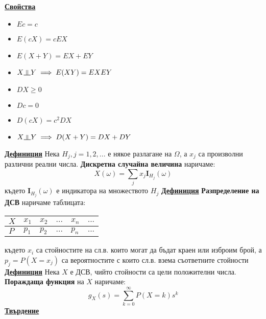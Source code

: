 \documentclass{article}
\newcommand{\indep}{\rotatebox[origin=c]{90}{$\models$}}
\begin{document}
\textbf{\underline{Свойства}}
\begin{multicols}{2}
    \begin{itemize}
        \item $Ec = c$
        \item $E(cX) = cEX$
        \item $E(X + Y) = EX + EY$
        \item $X \indep Y \implies E(XY) = EXEY$
        \item $DX \ge 0$
        \item $Dc = 0$
        \item $D(cX) = c^2DX$
        \item $X \indep Y \implies D(X + Y) = DX + DY$
    \end{itemize}
\end{multicols}
\textbf{\underline{Дефиниция}}
Нека $H_j, j = 1, 2, ...$ е някое разлагане на $\Omega$, а $x_j$ са произволни различни реални числа.
\textbf{Дискретна случайна величина} наричаме:
$$X(\omega) = \sum_{j}x_j\mathbf{I}_{H_j}(\omega)$$ където $\mathbf{I}_{H_j}(\omega)$ е индикатора на
множеството $H_j$ \newline\newline
\textbf{\underline{Дефиниция}}
\textbf{Разпределение на ДСВ} наричаме таблицата: \newline\newline
\begin{tabularx}{0.8\textwidth} { 
    | >{\centering\arraybackslash}X 
    | >{\centering\arraybackslash}X 
    | >{\centering\arraybackslash}X 
    | >{\centering\arraybackslash}X
    | >{\centering\arraybackslash}X
    | >{\centering\arraybackslash}X |}
   \hline
   $X$ & $x_1$ & $x_2$ & $...$ & $x_n$ & $...$ \\
   \hline
   $P$ & $p_1$ & $p_2$ & $...$ & $p_n$ & $...$  \\
   \hline
\end{tabularx} \newline\newline
където $x_i$ са стойностите на сл.в. които могат да бъдат краен или изброим брой, а $p_j = P(X = x_j)$ са вероятностите с които
сл.в. взема съответните стойности \newline\newline
\textbf{\underline{Дефиниция}}
Нека $X$ е ДСВ, чийто стойности са цели положителни числа. \textbf{Пораждаща функция} на $X$ наричаме:
$$g_X(s) = \sum_{k=0}^{\infty}P(X = k)s^k$$
\textbf{\underline{Твърдение}} \newline
\end{document}
